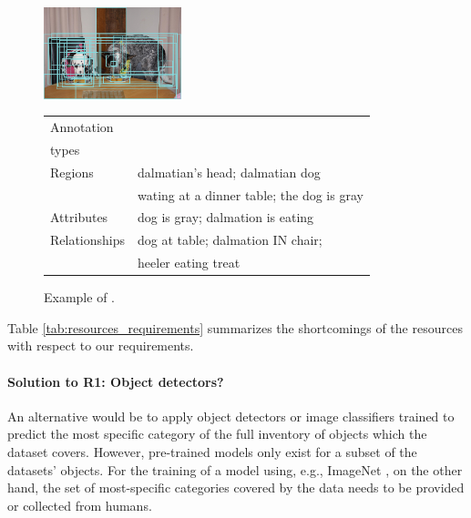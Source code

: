 {\begin{figure}[t]
	\begin{center}
	\begin{minipage}{.33\textwidth}
		\includegraphics[width=4cm]{fig/visual_genome_dogs.png}
	\end{minipage}
	\begin{minipage}{.65\textwidth}
		\begin{tabular}{l|l}
			\hline
			Annotation	& \\	
			types		& 	\\
			\hline \hline
			Regions &  dalmatian's head; dalmatian dog\\
					& wating at a dinner table; the dog is gray\\
			Attributes & dog is gray; dalmation is eating\\
			Relationships & dog at table; dalmation IN chair; \\
							& heeler eating treat \\
							\hline
		\end{tabular}
	\end{minipage}
	\caption{Example of \vgenome. \label{fig:ex_visualgenome}}
	\end{center}
\end{figure}


\noindent

Table \ref{tab:resources_requirements} summarizes the shortcomings of the resources with respect to our requirements. 

\paragraph{Solution to R1: Object detectors?}
An alternative would be to apply object detectors or image classifiers trained to predict the most specific category of the full inventory of objects which the dataset covers. 
However, pre-trained models only exist for a subset of the datasets' objects. 
For the training of a model using, e.g., ImageNet \cite{imagenet_cvpr09}, on the other hand, the  set of most-specific categories covered by the data needs to be provided or collected from humans. 

}
